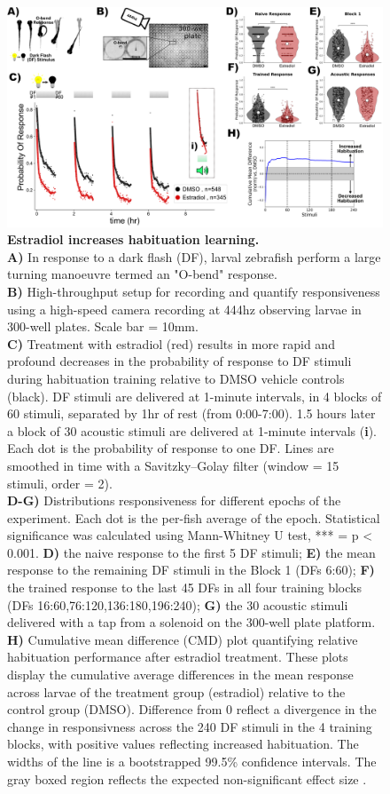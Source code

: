 \documentclass[9pt,lineno]{RandlettLab_elife}
\begin{document}
\begin{figure}
\begin{fullwidth}
\begin{center}
\includegraphics[width=0.75\linewidth]{figures/EstradiolEffect.png}
\caption{\textbf{Estradiol increases habituation learning.} \scriptsize
\\ \textbf{A)} In response to a dark flash (DF), larval zebrafish perform a large turning manoeuvre termed an "O-bend" response.
\\ \textbf{B)} High-throughput setup for recording and quantify responsiveness using a high-speed camera recording at 444hz observing larvae in 300-well plates. Scale bar = 10mm.
\\ \textbf{C)} Treatment with estradiol (red) results in more rapid and profound decreases in the probability of response to DF stimuli during habituation training relative to DMSO vehicle controls (black). DF stimuli are delivered at 1-minute intervals, in 4 blocks of 60 stimuli, separated by 1hr of rest (from 0:00-7:00). 1.5 hours later a block of 30 acoustic stimuli are delivered at 1-minute intervals (\textbf{i}). Each dot is the probability of response to one DF. Lines are smoothed in time with a Savitzky–Golay filter (window = 15 stimuli, order = 2). 
\\ \textbf{D-G)} Distributions responsiveness for different epochs of the experiment. Each dot is the per-fish average of the epoch. Statistical significance was calculated using Mann-Whitney U test, *** = p < 0.001.  \textbf{D)} the naive response to the first 5 DF stimuli; \textbf{E)} the mean response to the remaining DF stimuli in the Block 1 (DFs 6:60); \textbf{F)} the trained response to the last 45 DFs in all four training blocks (DFs 16:60,76:120,136:180,196:240); \textbf{G)} the 30 acoustic stimuli delivered with a tap from a solenoid on the 300-well plate platform. 
\\ \textbf{H)} Cumulative mean difference (CMD) plot quantifying relative habituation performance after estradiol treatment. These plots display the cumulative average differences in the mean response across larvae of the treatment group (estradiol) relative to the control group (DMSO). Difference from 0 reflect a divergence in the change in responsivness across the 240 DF stimuli in the 4 training blocks, with positive values reflecting increased habituation. The widths of the line is a bootstrapped 99.5\% confidence intervals. The gray boxed region reflects the expected non-significant effect size \citep{Randlett2019-fj}.
}
\end{center}
\end{fullwidth}
\end{figure}
\end{document}
